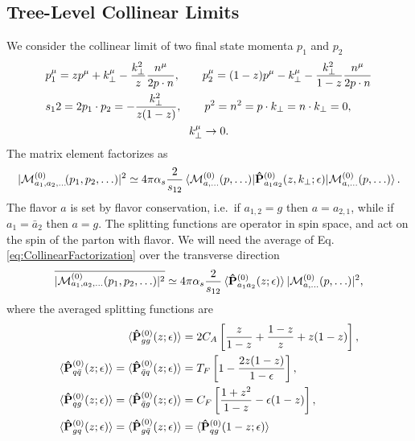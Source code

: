 \documentclass[a4paper,11pt]{article}
\begin{document}
\subsection{Tree-Level Collinear Limits}
We consider the collinear limit of two final state momenta $p_1$ and $p_2$ 
\begin{equation} 
\begin{split}
&p_1^\mu = z p^\mu + k_\perp^\mu - \frac{k_\perp^2}{z} \frac{n^\mu}{2 p \cdot n}, \qquad p_2^\mu = (1 - z) p^\mu - k_\perp^\mu - \frac{k_\perp^2}{1 - z} \frac{n^\mu}{2 p \cdot n} \\ 
&s_12 = 2 p_1 \cdot p_2 = - \frac{k_\perp^2}{z (1 - z)}, \qquad p^2 = n^2 = p \cdot k_\perp = n \cdot k_\perp  = 0, \\
& \hspace{4.5cm} k_\perp^\mu \rightarrow 0.
\end{split}
\end{equation}
The matrix element factorizes as 
\begin{equation}
|\mathcal{M}^{(0)}_{a_1, a_2, \dots} \! (p_1, p_2, \ldots)|^2 \simeq 4 \pi \alpha_s \frac{2}{s_{12}} \braket{\mathcal{M}^{(0)}_{a, \dots} (p, \ldots) | \mathbf{\hat{P}}_{a_1 a_2}^{(0)} (z, k_\perp; \epsilon) | \mathcal{M}_{a, \dots}^{(0)} (p, \ldots)}. 
\label{eq:CollinearFactorization}
\end{equation} 
The flavor $a$ is set by flavor conservation, i.e.\ if $a_{1,2} = g$ then $a = a_{2, 1}$, while if $a_1 = \bar{a}_2$ then $a = g$. The splitting functions are operator in spin space, and act on the spin of the parton with flavor. We will need the average of Eq. \eqref{eq:CollinearFactorization} over the transverse direction 
\begin{equation}
\overline{|\mathcal{M}^{(0)}_{a_1, a_2, \dots} (p_1, p_2, \ldots)|^2} \simeq 4 \pi \alpha_s \frac{2}{s_{12}} \braket{\mathbf{\hat{P}}_{a_1 a_2}^{(0)}(z; \epsilon)} |\mathcal{M}^{(0)}_{a,\dots} (p, \ldots)|^2,
\end{equation}
where the averaged splitting functions are 
\begin{equation}
\begin{split}
\braket{\mathbf{\hat{P}}_{gg}^{(0)}(z; \epsilon)} &= 2 C_A \left[ \frac{z}{1 - z} + \frac{1 - z}{z} + z (1 - z) \right], \\  
\braket{\mathbf{\hat{P}}_{q \bar{q}}^{(0)}(z; \epsilon)} = \braket{\mathbf{\hat{P}}_{\bar{q} q}^{(0)}(z; \epsilon)} &= T_F \left[1 - \frac{2 z (1 - z)}{1 - \epsilon} \right], \\ 
\braket{\mathbf{\hat{P}}_{q g}^{(0)}(z; \epsilon)} = \braket{\mathbf{\hat{P}}_{\bar{q} g}^{(0)}(z; \epsilon)} &= C_F \left[ \frac{1 + z^2}{1 - z} - \epsilon (1 - z) \right], \\ 
\braket{\mathbf{\hat{P}}_{gq}^{(0)}(z; \epsilon)} = \braket{\mathbf{\hat{P}}_{g\bar{q}}^{(0)}(z; \epsilon)} &= \braket{\mathbf{\hat{P}}_{qg}^{(0)}(1 - z; \epsilon)}
\end{split}
\end{equation} 
\end{document}
